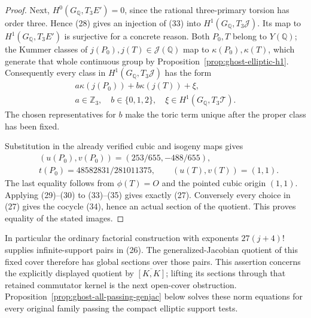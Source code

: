 \begin{proof}
Next, \(H^0(G_{\mathbb Q},T_3E')=0\), since
the rational three-primary torsion has order three.
Hence (28) gives an injection of (33) into
\(H^1(G_{\mathbb Q},T_3\mathcal J)\). Its map to
\(H^1(G_{\mathbb Q},T_3E')\) is surjective for a
concrete reason. Both \(P_0,T\) belong to
\(Y(\mathbb Q)\); the Kummer classes of
\(j(P_0),j(T)\in\mathcal J(\mathbb Q)\) map to
\(\kappa(P_0),\kappa(T)\), which generate that
whole continuous group by
Proposition~\ref{prop:ghost-elliptic-h1}.
Consequently every class in
\(H^1(G_{\mathbb Q},T_3\mathcal J)\) has the form
\[
\begin{gathered}
 a\kappa(j(P_0))+b\kappa(j(T))+\xi,\\
 a\in\mathbb Z_3,\quad b\in\{0,1,2\},\quad
 \xi\in H^1(G_{\mathbb Q},T_3\mathcal T).
\end{gathered}                                         \tag{34}
\]
The chosen representatives for \(b\) make the toric
term unique after the proper class has been fixed.

Substitution in the already verified cubic and
isogeny maps gives
\[
 \begin{split}
 &(u(P_0),v(P_0))=(253/655,-488/655),\\
 &t(P_0)=48582831/281011375,\qquad
 (u(T),v(T))=(1,1).
 \end{split}                                           \tag{35}
\]
The last equality follows from \(\phi(T)=O\) and
the pointed cubic origin \((1,1)\). Applying
(29)--(30) to (33)--(35) gives exactly (27).
Conversely every choice in (27) gives the cocycle
(34), hence an actual section of the quotient.
This proves equality of the stated images.
\end{proof}

In particular the ordinary factorial construction
with exponents \(27(j+4)!\) supplies infinite-support
pairs in (26). The generalized-Jacobian quotient of
this fixed cover therefore has global sections over
those pairs. This assertion concerns the explicitly
displayed quotient by \(\overline{[K,K]}\); lifting
its sections through that retained commutator kernel
is the next open-cover obstruction.
Proposition~\ref{prop:ghost-all-passing-genjac} below
solves these norm equations for every original family
passing the compact elliptic support tests.

